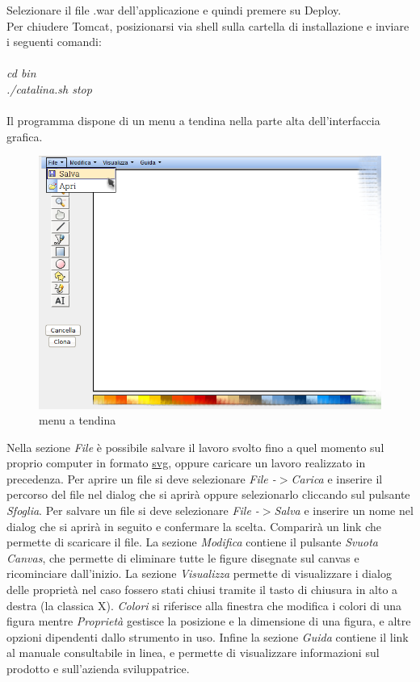 Selezionare il file .war dell'applicazione e quindi premere su Deploy.\\
Per chiudere Tomcat, posizionarsi via shell sulla cartella di installazione e inviare i seguenti comandi:\\
\\
\textit{cd bin}\\
\textit{./catalina.sh stop}\\
\\
 
 
 
Il programma dispone di un menu a tendina nella parte alta dell'interfaccia grafica.
 
\begin{figure}[!ht]
\centering
\includegraphics[scale=0.4]{images/menu.png}
\caption{menu a tendina}
\end{figure}
 
 
Nella sezione \textit{File} \`e possibile salvare il lavoro svolto fino a quel momento sul proprio computer in formato \underline{svg}, oppure caricare un lavoro realizzato in precedenza.
Per aprire un file si deve selezionare \textit{File -$ > $Carica} e inserire il percorso del file nel dialog che si aprir\`a oppure selezionarlo cliccando sul pulsante \textit{Sfoglia}.
Per salvare un file si deve selezionare \textit{File -$ > $Salva} e inserire un nome nel dialog che si aprir\`a in seguito e confermare la scelta. Comparir\`a un link che permette di scaricare il file.
La sezione \textit{Modifica} contiene il pulsante \textit{Svuota Canvas}, che permette di eliminare tutte le figure disegnate sul canvas e ricominciare dall'inizio.
La sezione \textit{Visualizza} permette di visualizzare i dialog delle propriet\`a nel caso fossero stati chiusi tramite il tasto di chiusura in alto a destra (la classica X). \textit{Colori} si riferisce alla finestra che modifica i colori di una figura mentre \textit{Propriet\`a} gestisce la posizione e la dimensione di una figura, e altre opzioni dipendenti dallo strumento in uso.
Infine la sezione \textit{Guida} contiene il link al manuale consultabile in linea, e permette di visualizzare informazioni sul prodotto e sull'azienda sviluppatrice.
\newpage
 
